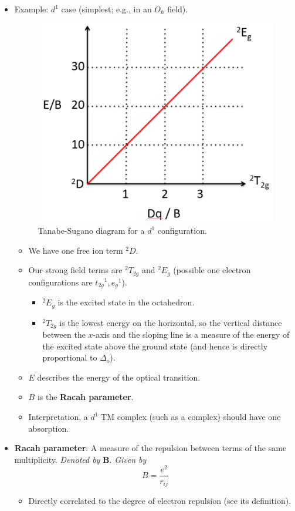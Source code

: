 \documentclass[../notes.tex]{subfiles}
\begin{document}
\begin{itemize}
\begin{itemize}
    \end{itemize}
    \item Example: $d^1$ case (simplest; e.g.,  in an $O_h$ field).
    \begin{figure}[h!]
        \centering
        \includegraphics[width=0.33\linewidth]{../ExtFiles/TSd1.png}
        \caption{Tanabe-Sugano diagram for a $d^1$ configuration.}
        \label{fig:TSd1}
    \end{figure}
    \begin{itemize}
        \item We have one free ion term ${}^2D$.
        \item Our strong field terms are ${}^2T_{2g}$ and ${}^2E_g$ (possible one electron configurations are ${t_{2g}}^1,{e_g}^1$).
        \begin{itemize}
            \item ${}^2E_g$ is the excited state in the octahedron.
            \item ${}^2T_{2g}$ is the lowest energy on the horizontal, so the vertical distance between the $x$-axis and the sloping line is a measure of the energy of the excited state above the ground state (and hence is directly proportional to $\Delta_o$).
        \end{itemize}
        \item $E$ describes the energy of the optical transition.
        \item $B$ is the \textbf{Racah parameter}.
        \item Interpretation, a $d^1$ TM complex (such as a  complex) should have one absorption.
    \end{itemize}
    \item \textbf{Racah parameter}: A measure of the repulsion between terms of the same multiplicity. \emph{Denoted by} $\bm{B}$. \emph{Given by}
    \begin{equation*}
        B = \frac{e^2}{r_{ij}}
    \end{equation*}
    \begin{itemize}
        \item Directly correlated to the degree of electron repulsion (see its definition).

\end{itemize}
\end{itemize}
\end{document}
